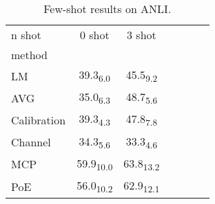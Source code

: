 \begin{table}[h]
\centering
\caption{Few-shot results on ANLI.}
\label{tab:few_shot}
\begin{tabular}{lcccccc}
n shot & 0 shot & 3 shot \\
method &  &  \\
LM & 39.3\textsubscript{6.0} & 45.5\textsubscript{9.2} \\
AVG & 35.0\textsubscript{6.3} & 48.7\textsubscript{5.6} \\
Calibration & 39.3\textsubscript{4.3} & 47.8\textsubscript{7.8} \\
Channel & 34.3\textsubscript{5.6} & 33.3\textsubscript{4.6} \\
MCP & 59.9\textsubscript{10.0} & 63.8\textsubscript{13.2} \\
PoE & 56.0\textsubscript{10.2} & 62.9\textsubscript{12.1} \\
\end{tabular}
\end{table}
